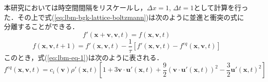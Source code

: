 本研究においては時空間間隔をリスケールし，$\Delta x = 1$, $\Delta t = 1$として計算を行った．その上で式(\ref{eq:lbm-bgk-lattice-boltzmann})は次のように並進と衝突の式に分離することができる．
\begin{equation}
  f'(\bm{x}+\bm{v}, \bm{v}, t)
  = f(\bm{x}, \bm{v}, t)
  \label{eq:lbm-streaming}
\end{equation}
\begin{equation}
  f(\bm{x}, \bm{v}, t+1)
  = f'(\bm{x}, \bm{v}, t) - \frac{1}{\tau} \left[ f'(\bm{x}, \bm{v}, t) - f^{eq}(\bm{x}, \bm{v}, t) \right]
  \label{eq:lbm-collision}
\end{equation}
このとき，式(\ref{eq:lbm-eq-1})は次のように表される．
\begin{equation}
  f^{eq}(\bm{x}, \bm{v}, t) = c_i(\bm{v}) \rho'(\bm{x}, t) \left[ 1 + 3\bm{v} \cdot \bm{u}'(\bm{x}, t) + \frac{9}{2}(\bm{v} \cdot \bm{u}'(\bm{x}, t))^2 - \frac{3}{2}\bm{u}'(\bm{x}, t)^2 \right]
  \label{eq:lbm-eq}
\end{equation}

